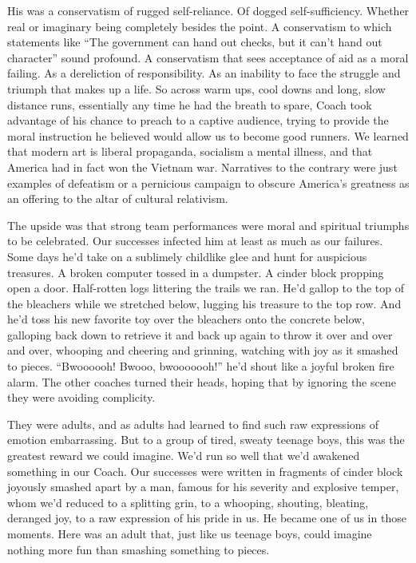 \documentclass[12pt, oneside]{memoir}
\begin{document}
His was a conservatism of rugged self-reliance.
Of dogged self-sufficiency.
Whether real or imaginary being completely besides the point.
A conservatism to which statements like ``The government can hand out
checks, but it can't hand out character'' sound profound.
A conservatism that sees acceptance of aid as a moral failing.
As a dereliction of responsibility.
As an inability to face the struggle and triumph that makes up a life.
So across warm ups, cool downs and long, slow distance runs, essentially
any time he had the breath to spare, Coach took advantage of his
chance to preach to a captive audience, trying to provide the moral
instruction he believed would allow us to become good runners.
We learned that modern art is liberal propaganda, socialism a mental
illness, and that America had in fact won the Vietnam war.
Narratives to the contrary were just examples of defeatism or a
pernicious campaign to obscure America's greatness as an offering to
the altar of cultural relativism.

The upside was that strong team performances were moral and spiritual
triumphs to be celebrated.
Our successes infected him at least as much as our failures.
Some days he'd take on a sublimely childlike glee and hunt for
auspicious treasures.
A broken computer tossed in a dumpster.
A cinder block propping open a door.
Half-rotten logs littering the trails we ran.
He'd gallop to the top of the bleachers while we stretched below,
lugging his treasure to the top row.
And he'd toss his new favorite toy over the bleachers onto the
concrete below, galloping back down to retrieve it and back up again
to throw it over and over and over, whooping and cheering and
grinning, watching with joy as it smashed to pieces.
``Bwoooooh! Bwooo, bwooooooh!'' he'd shout like a joyful broken fire
alarm.
The other coaches turned their heads, hoping that by ignoring the
scene they were avoiding complicity.

They were adults, and as adults had learned to find such raw
expressions of emotion embarrassing.
But to a group of tired, sweaty teenage boys, this was the greatest
reward we could imagine.
We'd run so well that we'd awakened something in our Coach.
Our successes were written in fragments of cinder block joyously
smashed apart by a man, famous for his severity and explosive temper,
whom we'd reduced to a splitting grin, to a whooping, shouting, bleating,
deranged joy, to a raw expression of his pride in us.
He became one of us in those moments.
Here was an adult that, just like us teenage boys, could imagine
nothing more fun than smashing something to pieces.
\end{document}
